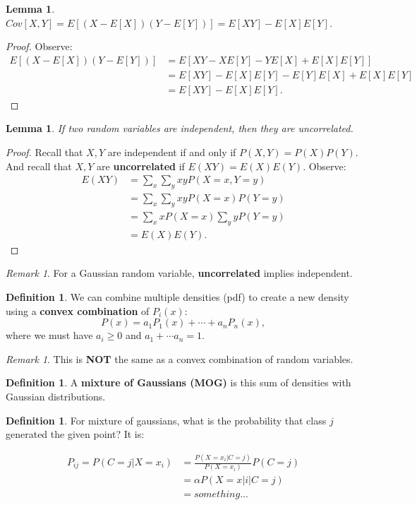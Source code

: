 \documentclass{amsbook}
\theoremstyle{plain}
\numberwithin{section}{chapter}
\numberwithin{equation}{chapter}
\newtheorem{lem}[theorem]{Lemma}
\theoremstyle{definition}
\newtheorem{Def}[theorem]{Definition}
\theoremstyle{remark}
\newtheorem{rem}[theorem]{Remark}
\newcommand{\bee}{\begin{equation}\begin{aligned}}
\newcommand{\eee}{\end{aligned}\end{equation}}
\newcommand{\fracc}{\frac}
\begin{document}
\begin{lem}
$Cov[X,Y] = E[(X - E[X])(Y - E[Y])] = E[XY] - E[X]E[Y]$. 
\end{lem}

\begin{proof}
Observe: 
\bee
E[(X - E[X])(Y - E[Y])] &=  E[XY - XE[Y] - YE[X] + E[X]E[Y]]\\
&= E[XY] - E[X]E[Y] - E[Y]E[X] + E[X]E[Y]\\
&= E[XY] - E[X]E[Y].
\eee
\end{proof}

\begin{lem}
If two random variables are independent, then they are uncorrelated. 
\end{lem}

\begin{proof}
Recall that $X,Y$ are independent if and only if $P(X,Y) = P(X)P(Y)$. And recall that $X,Y$ are \textbf{uncorrelated} if $E(XY) = E(X)E(Y)$. Observe:
\bee
E(XY) &= \sum_x \sum_y xy P(X = x,Y = y)\\
&= \sum_x \sum_y xy P(X = x)P(Y = y)\\
&= \sum_x x P(X = x) \sum_y y P(Y = y)\\
&= E(X)E(Y).
\eee
\end{proof}

\begin{rem}
For a Gaussian random variable, \textbf{uncorrelated} implies independent. 
\end{rem}

\begin{Def}
We can combine multiple densities (pdf) to create a new density using a \textbf{convex combination} of $P_i(x)$:
$$
P(x) = a_1P_1(x) + \cdots + a_nP_n(x),
$$
where we must have $a_i \geq 0$ and $a_1 + \cdots a_n = 1$. 
\end{Def}

\begin{rem}
This is \textbf{NOT} the same as a convex combination of random variables. 
\end{rem}

\begin{Def}
A \textbf{mixture of Gaussians (MOG) } is this sum of densities with Gaussian distributions. 
\end{Def}


\begin{Def}
For mixture of gaussians, what is the probability that class $j$ generated the given point? It is: 

\bee
P_{ij} = P(C = j|X = x_i) &= \fracc{P(X = x_i|C = j)}{P(X = x_i)}P(C = j)\\
&= \alpha P(X = x|i|C = j)\\
&= something...
\eee
\end{Def}
\end{document}
